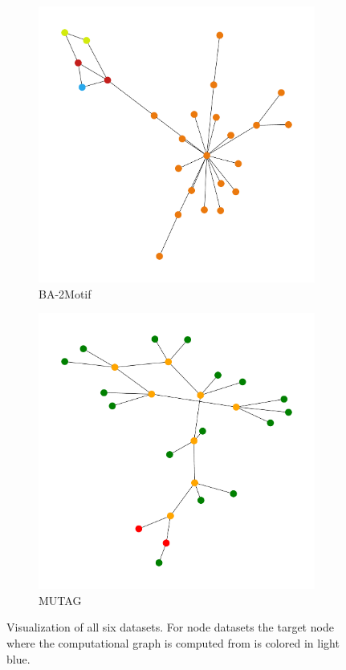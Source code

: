 \begin{figure}[H]
    \vspace{0.5cm}
    
    \begin{subfigure}[b]{0.4\textwidth}
        \includegraphics[width=\textwidth]{img/BA-2Motif-VIS-UNLABELED.pdf}
        \caption{BA-2Motif}
    \end{subfigure}
    \hfill
    \begin{subfigure}[b]{0.4\textwidth}
        \includegraphics[width=\textwidth]{img/MUTAG-VIS-LARGE-UNLABELED.pdf}
        \caption{MUTAG}
    \end{subfigure}

    \caption[Visualization of original PGExplainer datasets]{Visualization of all six datasets. For node datasets the target node where the computational graph is computed from is colored in light blue.}
\end{figure}

